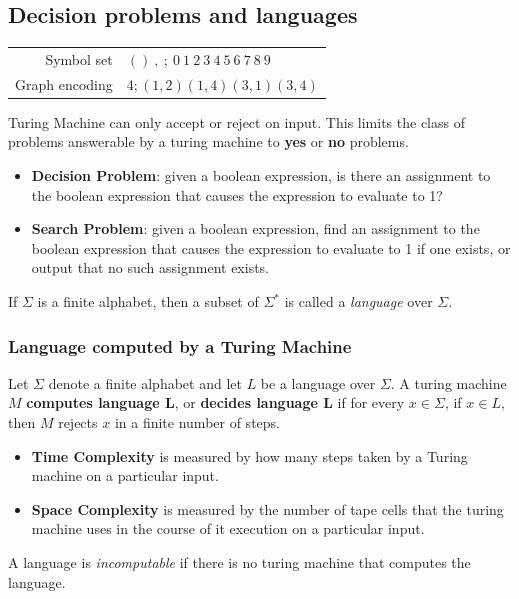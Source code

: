 \subsection{Decision problems and languages}
\begin{center}
  \begin{tabular}{r|l}
    Symbol set     & ${()~,~;~0~1~2~3~4~5~6~7~8~9}$ \\
    Graph encoding & $4;(1,2)(1,4)(3,1)(3,4)$
  \end{tabular}
\end{center}
Turing Machine can only accept or reject on input.
This limits the class of problems answerable by a turing machine to \textbf{yes} or \textbf{no} problems.
\begin{itemize}
  \item \textbf{Decision Problem}: given a boolean expression, is there
        an assignment to the boolean expression that causes the expression to evaluate to 1?
  \item \textbf{Search Problem}: given a boolean expression, find an assignment to the boolean
        expression that causes the expression to evaluate to 1 if one exists,
        or output that no such assignment exists.
\end{itemize}
If $\Sigma$ is a finite alphabet, then a subset of $\Sigma^*$ is called a \textit{language} over $\Sigma$.

\subsubsection*{Language computed by a Turing Machine}
Let $\Sigma$ denote a finite alphabet and let $L$ be a language over $\Sigma$.
A turing machine $M$ \textbf{computes language L}, or \textbf{decides language L}
if for every $x \in \Sigma$, if $x \in L$, then $M$ rejects $x$ in a finite number of steps.
\begin{itemize}
  \item \textbf{Time Complexity} is measured by how many steps taken by a Turing machine on a particular input.
  \item \textbf{Space Complexity} is measured by the number of tape cells that the turing machine uses in the
        course of it execution on a particular input.
\end{itemize}
A language is \textit{incomputable} if there is no turing machine that computes the language.